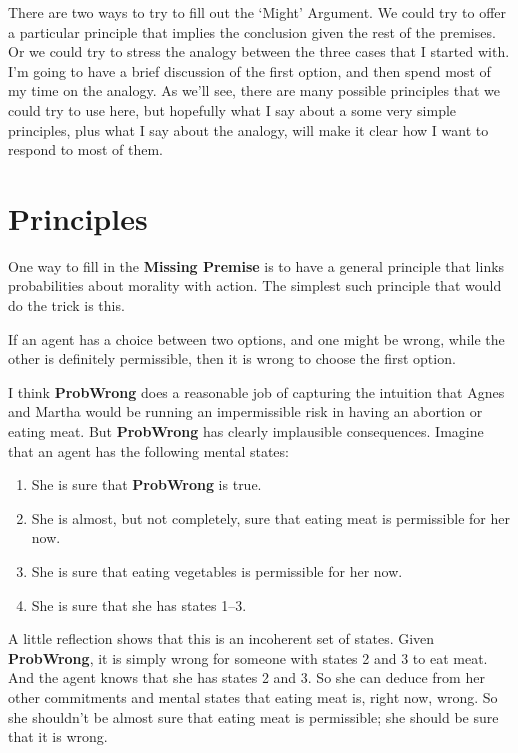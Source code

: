 \documentclass[
  10pt,
  letterpaper,
  DIV=11,
  numbers=noendperiod,
  twoside]{scrartcl}
\providecommand{\tightlist}{%
  \setlength{\itemsep}{0pt}\setlength{\parskip}{0pt}}\usepackage{longtable,booktabs,array}
\begin{document}
There are two ways to try to fill out the `Might' Argument. We could try
to offer a particular principle that implies the conclusion given the
rest of the premises. Or we could try to stress the analogy between the
three cases that I started with. I'm going to have a brief discussion of
the first option, and then spend most of my time on the analogy. As
we'll see, there are many possible principles that we could try to use
here, but hopefully what I say about a some very simple principles, plus
what I say about the analogy, will make it clear how I want to respond
to most of them.

\section{Principles}\label{principles}

One way to fill in the \textbf{Missing Premise} is to have a general
principle that links probabilities about morality with action. The
simplest such principle that would do the trick is this.

\begin{description}
\tightlist
\item[ProbWrong]
If an agent has a choice between two options, and one might be wrong,
while the other is definitely permissible, then it is wrong to choose
the first option.
\end{description}

I think \textbf{ProbWrong} does a reasonable job of capturing the
intuition that Agnes and Martha would be running an impermissible risk
in having an abortion or eating meat. But \textbf{ProbWrong} has clearly
implausible consequences. Imagine that an agent has the following mental
states:

\begin{enumerate}
\def\labelenumi{\arabic{enumi}.}
\tightlist
\item
  She is sure that \textbf{ProbWrong} is true.
\item
  She is almost, but not completely, sure that eating meat is
  permissible for her now.
\item
  She is sure that eating vegetables is permissible for her now.
\item
  She is sure that she has states 1--3.
\end{enumerate}

A little reflection shows that this is an incoherent set of states.
Given \textbf{ProbWrong}, it is simply wrong for someone with states 2
and 3 to eat meat. And the agent knows that she has states 2 and 3. So
she can deduce from her other commitments and mental states that eating
meat is, right now, wrong. So she shouldn't be almost sure that eating
meat is permissible; she should be sure that it is wrong.
\end{document}
